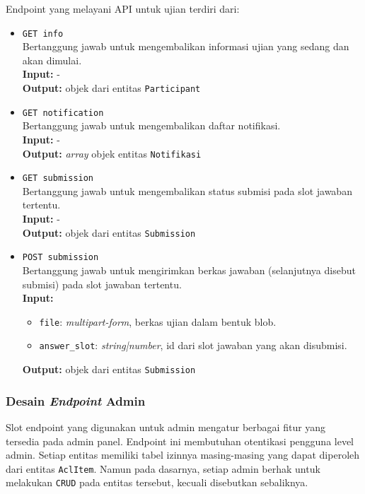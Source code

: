     Endpoint yang melayani API untuk ujian terdiri dari:
    \begin{itemize}
        \item \texttt{GET info} \\
            Bertanggung jawab untuk mengembalikan informasi ujian yang sedang
            dan akan dimulai. \\
            \textbf{Input:} -\\
            \textbf{Output:} objek dari entitas \texttt{Participant}

        \item \texttt{GET notification} \\
            Bertanggung jawab untuk mengembalikan daftar notifikasi.\\
            \textbf{Input:} -\\
            \textbf{Output:} \textit{array} objek entitas \texttt{Notifikasi}

        \item \texttt{GET submission} \\
            Bertanggung jawab untuk mengembalikan status submisi pada slot
            jawaban tertentu.\\
            \textbf{Input:} -\\
            \textbf{Output:} objek dari entitas \texttt{Submission}

        \item \texttt{POST submission} \\
            Bertanggung jawab untuk mengirimkan berkas jawaban (selanjutnya
            disebut submisi) pada slot jawaban tertentu.\\
            \textbf{Input:} \begin{itemize}
                \item \texttt{file}: \textit{multipart-form}, berkas ujian dalam
                    bentuk blob.
                \item \texttt{answer\_slot}: \textit{string|number}, id dari
                    slot jawaban yang akan disubmisi.
            \end{itemize}
            \textbf{Output:} objek dari entitas \texttt{Submission}
    \end{itemize}
    
\subsubsection{Desain \textit{Endpoint} Admin} Slot endpoint yang digunakan
    untuk admin mengatur berbagai fitur yang tersedia pada admin panel. Endpoint
    ini membutuhan otentikasi pengguna level admin. Setiap entitas memiliki
    tabel izinnya masing-masing yang dapat diperoleh dari entitas
    \texttt{AclItem}. Namun pada dasarnya, setiap admin berhak untuk melakukan
    \texttt{CRUD} pada entitas tersebut, kecuali disebutkan sebaliknya.
    
